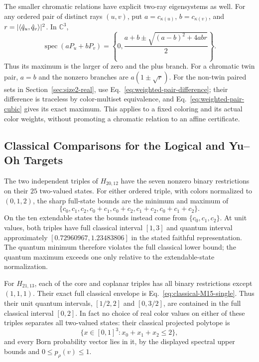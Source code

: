 \documentclass[aps,pra,reprint,superscriptaddress,longbibliography,nofootinbib,floatfix,10pt]{revtex4-2}
\theoremstyle{definition}\newtheorem{definition}[theorem]{Definition}
\theoremstyle{remark}\newtheorem{remark}[theorem]{Remark}
\newcommand{\C}{\mathbb C}\newcommand{\R}{\mathbb R}\newcommand{\Q}{\mathbb Q}
\begin{document}
The smaller chromatic relations have explicit two-ray eigensystems as well. For any ordered pair of distinct rays $(u,v)$, put $a=c_{\kappa(u)}$, $b=c_{\kappa(v)}$, and $r=|\langle \hat q_u,\hat q_v\rangle|^2$. In $\C^3$,
\begin{equation}\label{eq:weighted-two-ray-spectrum}
\operatorname{spec}(aP_u+bP_v)
=\left\{0,\frac{a+b\pm\sqrt{(a-b)^2+4abr}}2\right\}.
\end{equation}
Thus its maximum is the larger of zero and the plus branch. For a chromatic twin pair, $a=b$ and the nonzero branches are $a(1\pm\sqrt r)$. For the non-twin paired sets in Section~\ref{sec:size2-real}, use Eq.~\eqref{eq:weighted-pair-difference}; their difference is traceless by color-multiset equivalence, and Eq.~\eqref{eq:weighted-pair-cubic} gives its exact maximum. This applies to a fixed coloring and its actual color weights, without promoting a chromatic relation to an affine certificate.

\subsection{Classical Comparisons for the Logical and Yu--Oh Targets}\label{sec:classical-YO}

The two independent triples of $H_{20,12}$ have the seven nonzero binary restrictions on their $25$ two-valued states. For either ordered triple, with colors normalized to $(0,1,2)$, the sharp full-state bounds are the minimum and maximum of
\begin{equation}\label{eq:classical-H20-envelope}
\{c_0,c_1,c_2,c_0+c_1,c_0+c_2,c_1+c_2,c_0+c_1+c_2\}.
\end{equation}
On the ten extendable states the bounds instead come from $\{c_0,c_1,c_2\}$. At unit values, both triples have full classical interval $[1,3]$ and quantum interval approximately $[0.72960967,1.23483806]$ in the stated faithful representation. The quantum minimum therefore violates the full classical lower bound; the quantum maximum exceeds one only relative to the extendable-state normalization.

For $H_{21,13}$, each of the core and coplanar triples has all binary restrictions except $(1,1,1)$. Their exact full classical envelope is Eq.~\eqref{eq:classical-M15-single}. Thus their unit quantum intervals, $[1/2,2]$ and $[0,3/2]$, are contained in the full classical interval $[0,2]$. In fact no choice of real color values on either of these triples separates all two-valued states: their classical projected polytope is
\[
\{x\in[0,1]^3:x_0+x_1+x_2\le2\},
\]
and every Born probability vector lies in it, by the displayed spectral upper bounds and $0\le p_\rho(v)\le1$.
\end{document}
